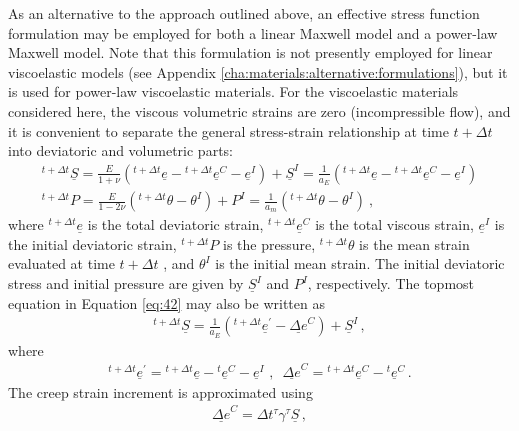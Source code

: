 As an alternative to the approach outlined above, an effective stress
function formulation \cite{Kojic:Bathe:1987} may be employed for
both a linear Maxwell model and a power-law Maxwell model. Note that
this formulation is not presently employed for linear viscoelastic
models (see Appendix \vref{cha:materials:alternative:formulations}), but it
is used for power-law viscoelastic materials. For the viscoelastic
materials considered here, the viscous volumetric strains are zero
(incompressible flow), and it is convenient to separate the general
stress-strain relationship at time $t+\Delta t$ into deviatoric and
volumetric parts:
\begin{gather}
\phantom{}{}^{t+\Delta t}\underline{S}=\frac{E}{1+\nu}\left(^{t+\Delta t}\underline{e}-\phantom{}^{t+\Delta t}\underline{e}^{C}-\underline{e}^{I}\right)+\underline{S}^{I}=\frac{1}{a_{E}}\left(^{t+\Delta t}\underline{e}-\phantom{}^{t+\Delta t}\underline{e}^{C}-\underline{e}^{I}\right)\label{eq:42}\\
^{t+\Delta t}P=\frac{E}{1-2\nu}\left(^{t+\Delta t}\theta-\theta^{I}\right)+P^{I}=\frac{1}{a_{m}}\left(^{t+\Delta t}\theta-\theta^{I}\right)\:,\nonumber 
\end{gather}
where $^{t+\Delta t}\underline{e}$ is the total deviatoric strain,
$^{t+\Delta t}\underline{e}^{C}$ is the total viscous strain, $\underline{e}^{I}$
is the initial deviatoric strain, $^{t+\Delta t}P$ is the pressure,
$^{t+\Delta t}\theta$ is the mean strain evaluated at time $t+\Delta t$
, and $\theta^{I}$ is the initial mean strain. The initial deviatoric
stress and initial pressure are given by $\underline{S}^{I}$ and
$P^{I}$, respectively. The topmost equation in Equation \vref{eq:42}
may also be written as
\begin{gather}
^{t+\Delta t}\underline{S}=\frac{1}{a_{E}}(^{t+\Delta t}\underline{e}^{\prime}-\underline{\Delta e}^{C})+\underline{S}^{I}\,,\label{eq:43}
\end{gather}
where
\begin{gather}
^{t+\Delta t}\underline{e}^{\prime}=\phantom{}^{t+\Delta t}\underline{e}-\phantom{}^{t}\underline{e}^{C}-\underline{e}^{I}\,\,,\,\,\,\underline{\Delta e}^{C}=\phantom{}^{t+\Delta t}\underline{e}^{C}-\phantom{}^{t}\underline{e}^{C}\,.\label{eq:44}
\end{gather}
The creep strain increment is approximated using
\begin{gather}
\underline{\Delta e}^{C}=\Delta t\phantom{}^{\tau}\gamma\phantom{}^{\tau}\underline{S}\,,\label{eq:45}
\end{gather}
